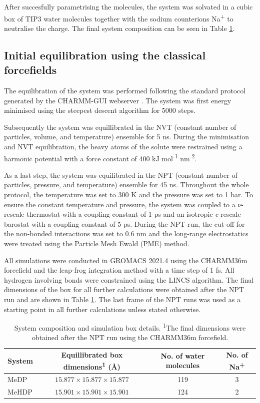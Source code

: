 After succesfully parametrising the molecules, the system was solvated in a cubic box of TIP3 water molecules together with the sodium counterions Na\textsuperscript{+} to neutralise the charge. The final system composition can be seen in Table \ref{tab:system-before-equilibration}.

\subsection{Initial equilibration using the classical forcefields}
The equilibration of the system was performed following the standard protocol generated by the CHARMM-GUI webserver \citep{jo_charmm-gui_2008}. The system was first energy minimised using the steepest descent algorithm for 5000 steps. 

Subsequently the system was equillibrated in the NVT (constant number of particles, volume, and temperature) ensemble for 5 ns. During the minimisation and NVT equilibration, the heavy atoms of the solute were restrained using a harmonic potential with a force constant of 400 kJ mol\textsuperscript{-1} nm\textsuperscript{-2}.

As a last step, the system was equilibrated in the NPT (constant number of particles, pressure, and temperature) ensemble for 45 ns. Throughout the whole protocol, the temperature was set to 300 K and the pressure was set to 1 bar. To ensure the constant temperature and pressure, the system was coupled to a $\nu$-rescale thermostat with a coupling constant of 1 ps and an isotropic \textit{c}-rescale barostat with a coupling constant of 5 ps. During the NPT run, the cut-off for the non-bonded interactions was set to 0.6 nm and the long-range electrostatics were treated using the Particle Mesh Ewald (PME) method.

All simulations were conducted in GROMACS 2021.4 \citep{abraham_gromacs_2015} using the CHARMM36m forcefield \citep{huang_charmm36m_2017} and the leap-frog integration method with a time step of 1 fs. All hydrogen involving bonds were constrained using the LINCS algorithm. The final dimensions of the box for all further calculations were obtained after the NPT run and are shown in Table \ref{tab:system-before-equilibration}. The last frame of the NPT runs was used as a starting point in all further calculations unless stated otherwise.
\begin{table}[hb]
    \centering
    \caption{System composition and simulation box details. \textsuperscript{1}The final dimensions were obtained after the NPT run using the CHARMM36m forcefield.}
    \label{tab:system-before-equilibration}
    \begin{tabular}{@{}lccc@{}}
    \toprule
    System & Equillibrated box dimensions\textsuperscript{1} (\AA) & No. of water molecules & No. of Na\textsuperscript{+} \\
    \midrule
    MeDP  & $15.877 \times 15.877 \times 15.877$ & 119 & 3 \\
    MeHDP & $15.901 \times 15.901 \times 15.901$ & 124 & 2 \\
    \bottomrule
    \end{tabular}
\end{table}



